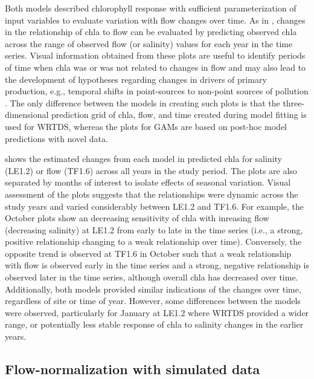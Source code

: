 \documentclass[letterpaper,12pt,oneside]{article}\usepackage[]{graphicx}\usepackage[]{color}
\begin{document}
Both models described chlorophyll response with sufficient parameterization of input variables to evaluate variation with flow changes over time.  As in \citet{Beck15}, changes in the relationship of \ac{chla} to flow can be evaluated by predicting observed \ac{chla} across the range of observed flow (or salinity) values for each year in the time series.  Visual information obtained from these plots are useful to identify periods of time when \ac{chla} was or was not related to changes in flow and may also lead to the development of hypotheses regarding changes in drivers of primary production, e.g., temporal shifts in point-sources to non-point sources of pollution \citep{Hirsch10,Beck15}.  The only difference between the models in creating such plots is that the three-dimensional prediction grid of \ac{chla}, flow, and time created during model fitting is used for \ac{WRTDS}, whereas the plots for \acp{GAM} are based on post-hoc model predictions with novel data. 

 shows the estimated changes from each model in predicted \ac{chla} for salinity (LE1.2) or flow (TF1.6) across all years in the study period.  The plots are also separated by months of interest to isolate effects of seasonal variation.  Visual assessment of the plots suggests that the relationships were dynamic across the study years and varied considerably between LE1.2 and TF1.6.  For example, the October plots show an decreasing sensitivity of \ac{chla} with inreasing flow (decreasing salinity) at LE1.2 from early to late in the time series (i.e., a strong, positive relationship changing to a weak relationship over time).  Conversely, the opposite trend is observed at TF1.6 in October such that a weak relationship with flow is observed early in the time series and a strong, negative relationship is observed later in the time series, although overall \ac{chla} has decreased over time.  Additionally, both models provided similar indications of the changes over time, regardless of site or time of year.  However, some differences between the models were observed, particularly for January at LE1.2 where \ac{WRTDS} provided a wider range, or potentially less stable response of \ac{chla} to salinity changes in the earlier years.

\subsection{Flow-normalization with simulated data}
\end{document}
